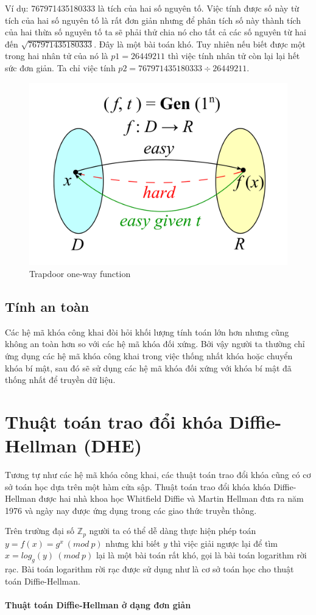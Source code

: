 \documentclass[a4paper,12pt]{report}
\begin{document}
Ví dụ: 767971435180333 là tích của hai số nguyên tố. Việc tính được số này từ tích của hai số nguyên tố là rất đơn giản nhưng để phân tích số này thành tích của hai thừa số nguyên tố ta sẽ phải thử chia nó cho tất cả các số nguyên từ hai đến $\sqrt{767971435180333}$. Đây là một bài toán khó. Tuy nhiên nếu biết được một trong hai nhân tử của nó là $p1 = 26449211$ thì việc tính nhân tử còn lại lại hết sức đơn giản. Ta chỉ việc tính $p2 = 767971435180333 \div 26449211$.

\begin{center}
\begin{figure}[H]
\centering 
\includegraphics[width=0.6\linewidth]{../trap.png}
\caption{Trapdoor one-way function} \label{sign1}
\end{figure}
\end{center}
\subsection*{Tính an toàn}
Các hệ mã khóa công khai đòi hỏi khối lượng tính toán lớn hơn nhưng cũng không an toàn hơn so với các hệ mã khóa đối xứng. Bởi vậy người ta thường chỉ ứng dụng các hệ mã khóa công khai trong việc thống nhất khóa hoặc chuyển khóa bí mật, sau đó sẽ sử dụng các hệ mã khóa đối xứng với khóa bí mật đã thống nhất để truyền dữ liệu.
\section{Thuật toán trao đổi khóa Diffie-Hellman (DHE)}
Tương tự như các hệ mã khóa công khai, các thuật toán trao đổi khóa cũng có cơ sở toán học dựa trên một hàm cửa sập. Thuật toán trao đổi khóa khóa Diffie-Hellman   được hai nhà khoa học Whitfield Diffie và Martin Hellman đưa ra năm 1976 và ngày nay được ứng dụng trong các giao thức truyền thông.

Trên trường đại số  $\mathbb{Z}_p$ người ta có thể dễ dàng thực hiện phép toán $y = f(x) = g^x \ (mod \ p)$ nhưng khi biết $y$ thì việc giải ngược lại để tìm $x = log_g(y) \ (mod \ p)$ lại là một bài toán rất khó, gọi là bài toán logarithm rời rạc. Bài toán logarithm rời rạc được sử dụng như là cơ sở toán học cho thuật toán Diffie-Hellman. \\ \\
\textbf{Thuật toán Diffie-Hellman ở dạng đơn giản}
\end{document}
